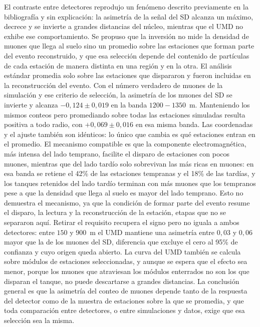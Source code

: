 El contraste entre detectores reprodujo un fenómeno descrito previamente en la bibliografía y sin explicación: la asimetría de la señal del SD alcanza un máximo, decrece y se invierte a grandes distancias del núcleo, mientras que el UMD no exhibe ese comportamiento. Se propuso que la inversión no mide la densidad de muones que llega al suelo sino un promedio sobre las estaciones que forman parte del evento reconstruido, y que esa selección depende del contenido de partículas de cada estación de manera distinta en una región y en la otra. El análisis estándar promedia solo sobre las estaciones que dispararon y fueron incluidas en la reconstrucción del evento. Con el número verdadero de muones de la simulación y ese criterio de selección, la asimetría de los muones del SD se invierte y alcanza $-0,124 \pm 0,019$ en la banda $1200-1350$~m. Manteniendo los mismos conteos pero promediando sobre todas las estaciones simuladas resulta positiva a todo radio, con $+0,069 \pm 0,016$ en esa misma banda. Las coordenadas y el ajuste también son idénticos: lo único que cambia es qué estaciones entran en el promedio. El mecanismo compatible es que la componente electromagnética, más intensa del lado temprano, facilite el disparo de estaciones con pocos muones, mientras que del lado tardío solo sobrevivan las más ricas en muones: en esa banda se retiene el 42\% de las estaciones tempranas y el 18\% de las tardías, y los tanques retenidos del lado tardío terminan con más muones que los tempranos pese a que la densidad que llega al suelo es mayor del lado temprano. Esto no demuestra el mecanismo, ya que la condición de formar parte del evento resume el disparo, la lectura y la reconstrucción de la estación, etapas que no se separaron aquí. Retirar el requisito recupera el signo pero no iguala a ambos detectores: entre $150$ y $900$~m el UMD mantiene una asimetría entre $0,03$ y $0,06$ mayor que la de los muones del SD, diferencia que excluye el cero al 95\% de confianza y cuyo origen queda abierto. La curva del UMD también se calcula sobre módulos de estaciones seleccionadas, y aunque se espera que el efecto sea menor, porque los muones que atraviesan los módulos enterrados no son los que disparan el tanque, no puede descartarse a grandes distancias. La conclusión general es que la asimetría del conteo de muones depende tanto de la respuesta del detector como de la muestra de estaciones sobre la que se promedia, y que toda comparación entre detectores, o entre simulaciones y datos, exige que esa selección sea la misma.

